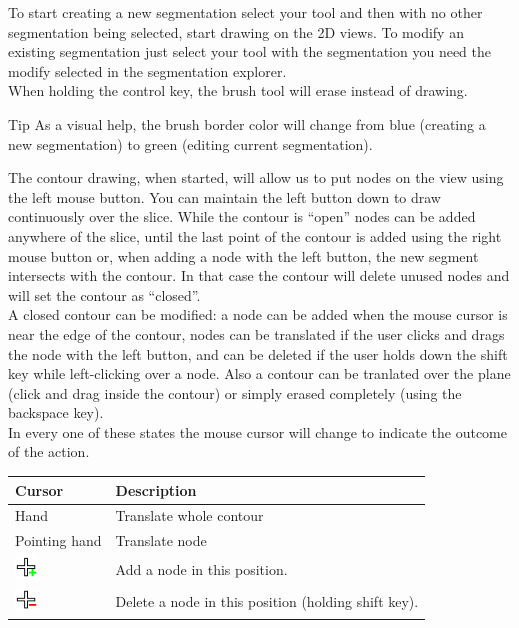 To start creating a new segmentation select your tool and then with no other
segmentation being selected, start drawing on the 2D views. To modify an existing
segmentation just select your tool with the segmentation you need the modify 
selected in the segmentation explorer.\\
When holding the control key, the brush tool will erase instead of drawing.\\

\vspace{0.3cm}
\begin{bclogo}[couleur = yellow!33, logo= \bcbook]
{Tip} As a visual help, the brush border color will change from blue (creating a
new segmentation) to green (editing current segmentation). 
\end{bclogo}
\vspace{0.3cm}

The contour drawing, when started, will allow us to put nodes on the view using the left
mouse button. You can maintain the left button down to draw continuously over the slice.
While the contour is ``open'' nodes can be added anywhere of the slice, until the last point
of the contour is added using the right mouse button or, when adding a node with the left
button, the new segment intersects with the contour. In that case the contour will delete
unused nodes and will set the contour as ``closed''.\\
A closed contour can be modified: a node can be added when the mouse cursor is near the edge
of the contour, nodes can be translated if the user clicks and drags the node with the left
button, and can be deleted if the user holds down the shift key while left-clicking over a node.
Also a contour can be tranlated over the plane (click and drag inside the contour) or simply
erased completely (using the backspace key).\\
In every one of these states the mouse cursor will change to indicate the outcome of the action.
\vspace{0.3cm}

\begin{tabular}{| m{1.3cm} | m{12cm} |}
\hline
\textbf{Cursor} & \textbf{Description}\\
\hline
Hand & Translate whole contour\\
\hline
Pointing hand & Translate node\\
\hline
\includegraphics[width=0.6cm]{../../frontend/rsc/cross-plus} & Add a node in this position.\\
\hline
\includegraphics[width=0.6cm]{../../frontend/rsc/cross-minus} & Delete a node in this position (holding shift key).\\
\hline
\end{tabular}
\vspace{0.3cm}

